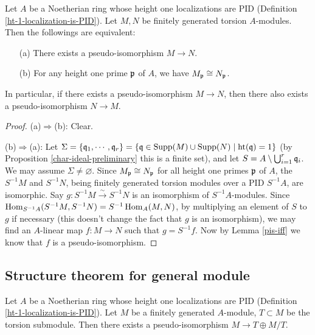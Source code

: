 \begin{prop}
\label{pis-symm}
\leanok
Let $A$ be a Noetherian ring whose height one localizations are PID
(Definition \ref{ht-1-localization-is-PID}).
Let $M,N$ be finitely generated torsion $A$-modules.
Then the followings are equivalent:
\begin{itemize}
\item[(a)]
There exists a pseudo-isomorphism $M\to N$.
\item[(b)]
For any height one prime ${\mathfrak{p}}$ of $A$, we have $M_{\mathfrak{p}}\cong N_{\mathfrak{p}}$.
\end{itemize}
In particular, if there exists a pseudo-isomorphism $M\to N$,
then there also exists a pseudo-isomorphism $N\to M$.
\end{prop}

\begin{proof}
(a)$\Rightarrow$(b): Clear.

(b)$\Rightarrow$(a): Let $\Sigma=\{{\mathfrak{q}}_1,\cdots,{\mathfrak{q}}_r\}
=\{{\mathfrak{q}}\in{\mathrm{Supp}}(M)\cup{\mathrm{Supp}}(N)\mid{\mathrm{ht}}({\mathfrak{q}})=1\}$
(by Proposition \ref{char-ideal-preliminary} this is a finite set),
and let $S=A\setminus\bigcup_{i=1}^r{\mathfrak{q}}_i$.
We may assume $\Sigma\neq\varnothing$.
Since $M_{\mathfrak{p}}\cong N_{\mathfrak{p}}$ for all height one primes ${\mathfrak{p}}$ of $A$,
the $S^{-1}M$ and $S^{-1}N$, being finitely generated torsion modules over
a PID $S^{-1}A$, are isomorphic. Say $g:S^{-1}M\xrightarrow\sim S^{-1}N$
is an isomorphism of $S^{-1}A$-modules.
Since $\operatorname{Hom}_{S^{-1}A}(S^{-1}M,S^{-1}N)=S^{-1}\operatorname{Hom}_A(M,N)$,
by multiplying an element of $S$ to $g$ if necessary
(this doesn't change the fact that $g$ is an isomorphism), we may find
an $A$-linear map $f:M\to N$
such that $g=S^{-1}f$.
Now by Lemma \ref{pis-iff} we know that $f$ is a pseudo-isomorphism.
\end{proof}

\subsection{Structure theorem for general module}

\begin{prop}
\label{pis-torsion-oplus-torsion-free}
\leanok
Let $A$ be a Noetherian ring whose height one localizations are PID
(Definition \ref{ht-1-localization-is-PID}).
Let $M$ be a finitely generated $A$-module,
$T\subset M$ be the torsion submodule.
Then there exists a pseudo-isomorphism $M\to T\oplus M/T$.
\end{prop}

